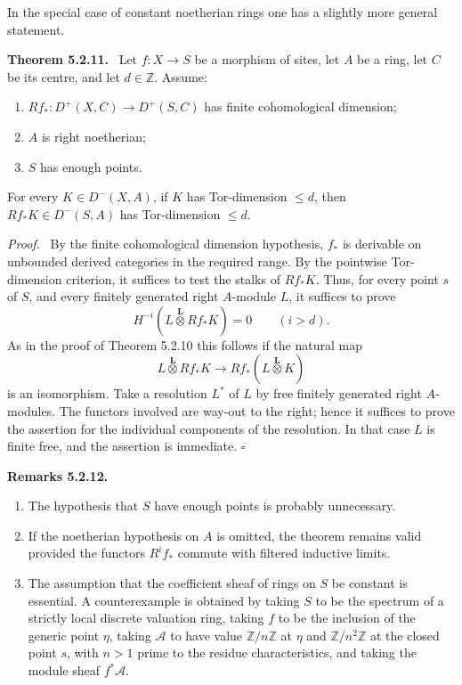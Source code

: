 \documentclass[12pt]{article}
\newcommand{\Aa}{\mathcal A}
\newcommand{\Zz}{\mathbb Z}
\newcommand{\otimesL}{\mathbin{\overset{\mathbf L}{\otimes}}}
\newcommand{\qedtext}{\hfill\(\square\)}
\newenvironment{statement}[1]{\par\medskip\noindent\textbf{#1.}\ }{\par\medskip}
\newenvironment{remarktext}[1]{\par\medskip\noindent\textbf{#1.}\ }{\par\medskip}
\newenvironment{prooftext}[1][Proof]{\par\noindent\emph{#1.}\ }{\par\medskip}
\begin{document}
In the special case of constant noetherian rings one has a slightly more general statement.

\begin{statement}{Theorem 5.2.11}
Let \(f:X\to S\) be a morphism of sites, let \(A\) be a ring, let \(C\) be its centre, and let \(d\in\Zz\). Assume:
\begin{enumerate}[label=(\roman*)]
\item \(Rf_*:D^+(X,C)\to D^+(S,C)\) has finite cohomological dimension;
\item \(A\) is right noetherian;
\item \(S\) has enough points.
\end{enumerate}
For every \(K\in D^-(X,A)\), if \(K\) has Tor-dimension \(\le d\), then \(Rf_*K\in D^-(S,A)\) has Tor-dimension \(\le d\).
\end{statement}

\begin{prooftext}
By the finite cohomological dimension hypothesis, \(f_*\) is derivable on unbounded derived categories in the required range. By the pointwise Tor-dimension criterion, it suffices to test the stalks of \(Rf_*K\). Thus, for every point \(s\) of \(S\), and every finitely generated right \(A\)-module \(L\), it suffices to prove
\[
H^{-i}(L\otimesL Rf_*K)=0\qquad (i>d).
\]
As in the proof of Theorem 5.2.10 this follows if the natural map
\[
L\otimesL Rf_*K\longrightarrow Rf_*(L\otimesL K)
\]
is an isomorphism. Take a resolution \(L^*\) of \(L\) by free finitely generated right \(A\)-modules. The functors involved are way-out to the right; hence it suffices to prove the assertion for the individual components of the resolution. In that case \(L\) is finite free, and the assertion is immediate. \qedtext
\end{prooftext}

\begin{remarktext}{Remarks 5.2.12}
\begin{enumerate}[label=(\roman*)]
\item The hypothesis that \(S\) have enough points is probably unnecessary.
\item If the noetherian hypothesis on \(A\) is omitted, the theorem remains valid provided the functors \(R^if_*\) commute with filtered inductive limits.
\item The assumption that the coefficient sheaf of rings on \(S\) be constant is essential. A counterexample is obtained by taking \(S\) to be the spectrum of a strictly local discrete valuation ring, taking \(f\) to be the inclusion of the generic point \(\eta\), taking \(\Aa\) to have value \(\Zz/n\Zz\) at \(\eta\) and \(\Zz/n^2\Zz\) at the closed point \(s\), with \(n>1\) prime to the residue characteristics, and taking the module sheaf \(f^*\Aa\).
\end{enumerate}
\end{remarktext}
\end{document}
